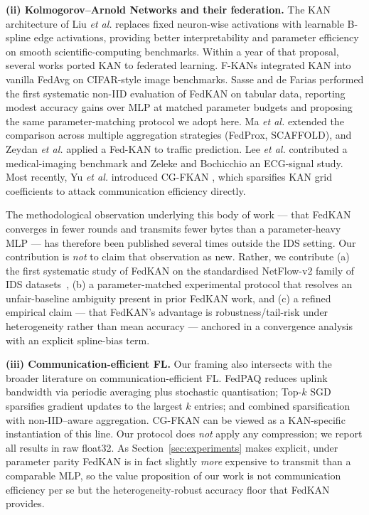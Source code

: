 \textbf{(ii) Kolmogorov--Arnold Networks and their federation.} The KAN architecture of Liu \emph{et al.} \cite{liu2024kan} replaces fixed neuron-wise activations with learnable B-spline edge activations, providing better interpretability and parameter efficiency on smooth scientific-computing benchmarks. Within a year of that proposal, several works ported KAN to federated learning. F-KANs \cite{zeydan2024fkans} integrated KAN into vanilla FedAvg on CIFAR-style image benchmarks. Sasse and de Farias \cite{sasse2024evaluating} performed the first systematic non-IID evaluation of FedKAN on tabular data, reporting modest accuracy gains over MLP at matched parameter budgets and proposing the same parameter-matching protocol we adopt here. Ma \emph{et al.} \cite{ma2025enhancing} extended the comparison across multiple aggregation strategies (FedProx, SCAFFOLD), and Zeydan \emph{et al.} \cite{zeydan2025fedkan} applied a Fed-KAN to traffic prediction. Lee \emph{et al.} \cite{lee2025unified} contributed a medical-imaging benchmark and Zeleke and Bochicchio \cite{zeleke2024federated} an ECG-signal study. Most recently, Yu \emph{et al.} introduced CG-FKAN \cite{yu2025cgfkan}, which sparsifies KAN grid coefficients to attack communication efficiency directly.

The methodological observation underlying this body of work --- that FedKAN converges in fewer rounds and transmits fewer bytes than a parameter-heavy MLP --- has therefore been published several times outside the IDS setting. Our contribution is \emph{not} to claim that observation as new. Rather, we contribute (a) the first systematic study of FedKAN on the standardised NetFlow-v2 family of IDS datasets~\cite{sarhan2022standard}, (b) a parameter-matched experimental protocol that resolves an unfair-baseline ambiguity present in prior FedKAN work, and (c) a refined empirical claim --- that FedKAN's advantage is robustness/tail-risk under heterogeneity rather than mean accuracy --- anchored in a convergence analysis with an explicit spline-bias term.

\textbf{(iii) Communication-efficient FL.} Our framing also intersects with the broader literature on communication-efficient FL. FedPAQ \cite{reisizadeh2020fedpaq} reduces uplink bandwidth via periodic averaging plus stochastic quantisation; Top-$k$ SGD \cite{aji2017topk} sparsifies gradient updates to the largest $k$ entries; and \cite{sattler2019sparse} combined sparsification with non-IID--aware aggregation. CG-FKAN \cite{yu2025cgfkan} can be viewed as a KAN-specific instantiation of this line. Our protocol does \emph{not} apply any compression; we report all results in raw float32. As Section~\ref{sec:experiments} makes explicit, under parameter parity FedKAN is in fact slightly \emph{more} expensive to transmit than a comparable MLP, so the value proposition of our work is not communication efficiency per se but the heterogeneity-robust accuracy floor that FedKAN provides.
